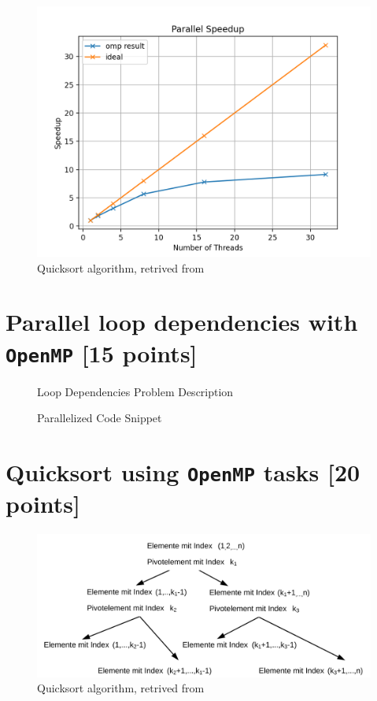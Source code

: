 \documentclass[unicode,11pt,a4paper,oneside,numbers=endperiod,openany]{scrartcl}
\begin{document}
\begin{figure}[H]
  \centering
  \includegraphics[width=\textwidth]{Images_Output/hist_speedup.png}
  \caption{Quicksort algorithm, retrived from \cite{parallelized_quicksort}}
  \label{fig:quicksort}
\end{figure}

\section{Parallel loop dependencies with \texttt{OpenMP} [15 points]}

\begin{figure}[H]
  \centering
  {\fontsize{8}{10}\selectfont
  }
  \caption{Loop Dependencies Problem Description}
  \label{fig:slurm_euler_2}
\end{figure}

\begin{figure}[H]
  \centering
  {\fontsize{8}{10}\selectfont
  }
  \caption{Parallelized Code Snippet}
  \label{fig:slurm_euler_2}
\end{figure}

\section{Quicksort using \texttt{OpenMP} tasks [20 points]}

\begin{figure}[H]
  \centering
  \includegraphics[width=\textwidth]{Images_Output/Quicksort.png}
  \caption{Quicksort algorithm, retrived from \cite{parallelized_quicksort}}
  \label{fig:quicksort}
\end{figure}
\end{document}
